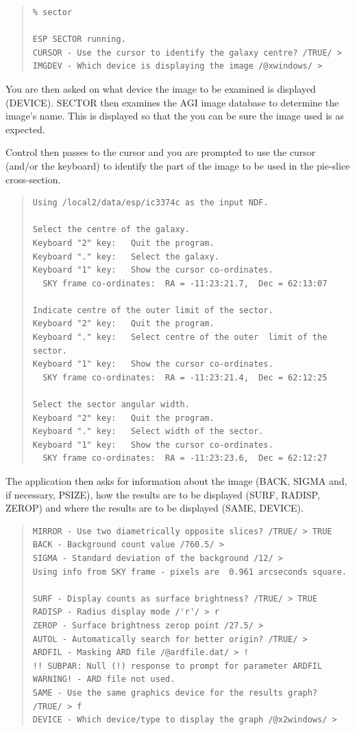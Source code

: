 \documentclass[twoside,11pt]{article}
\newenvironment{myquote}{\begin{quote}\begin{small}}{\end{small}\end{quote}}
\begin{document}
\begin{myquote}
\begin{verbatim}
% sector

ESP SECTOR running.
CURSOR - Use the cursor to identify the galaxy centre? /TRUE/ >
IMGDEV - Which device is displaying the image /@xwindows/ >
\end{verbatim}
\end{myquote}

You are then asked
on what device the image to be examined is displayed (DEVICE).
SECTOR then examines the AGI image database to determine the image's name.
This is displayed so that the you can be sure the image used is as expected.

Control then passes to the cursor and you are prompted to use the
cursor (and/or the keyboard) to identify the part of the image to be used in
the pie-slice cross-section.

\begin{myquote}
\begin{verbatim}
Using /local2/data/esp/ic3374c as the input NDF.

Select the centre of the galaxy.
Keyboard "2" key:   Quit the program.
Keyboard "." key:   Select the galaxy.
Keyboard "1" key:   Show the cursor co-ordinates.
  SKY frame co-ordinates:  RA = -11:23:21.7,  Dec = 62:13:07

Indicate centre of the outer limit of the sector.
Keyboard "2" key:   Quit the program.
Keyboard "." key:   Select centre of the outer  limit of the sector.
Keyboard "1" key:   Show the cursor co-ordinates.
  SKY frame co-ordinates:  RA = -11:23:21.4,  Dec = 62:12:25

Select the sector angular width.
Keyboard "2" key:   Quit the program.
Keyboard "." key:   Select width of the sector.
Keyboard "1" key:   Show the cursor co-ordinates.
  SKY frame co-ordinates:  RA = -11:23:23.6,  Dec = 62:12:27
\end{verbatim}
\end{myquote}

The application then asks
for information about the image (BACK, SIGMA and, if necessary, PSIZE),
how the results are to be displayed (SURF, RADISP, ZEROP)
and where the results are to be displayed (SAME, DEVICE).

\begin{myquote}
\begin{verbatim}
MIRROR - Use two diametrically opposite slices? /TRUE/ > TRUE
BACK - Background count value /760.5/ >
SIGMA - Standard deviation of the background /12/ >
Using info from SKY frame - pixels are  0.961 arcseconds square.

SURF - Display counts as surface brightness? /TRUE/ > TRUE
RADISP - Radius display mode /'r'/ > r
ZEROP - Surface brightness zerop point /27.5/ >
AUTOL - Automatically search for better origin? /TRUE/ >
ARDFIL - Masking ARD file /@ardfile.dat/ > !
!! SUBPAR: Null (!) response to prompt for parameter ARDFIL
WARNING! - ARD file not used.
SAME - Use the same graphics device for the results graph? /TRUE/ > f
DEVICE - Which device/type to display the graph /@x2windows/ >
\end{verbatim}
\end{myquote}
\end{document}
